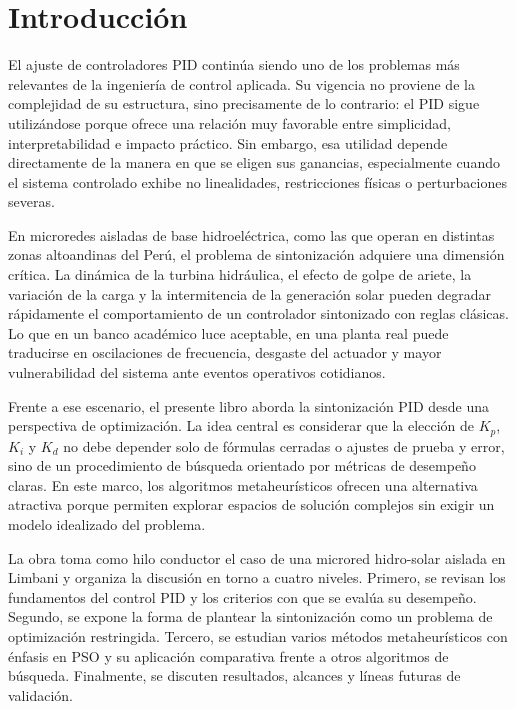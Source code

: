 \chapter*{Introducción}

El ajuste de controladores PID continúa siendo uno de los problemas más relevantes de la
ingeniería de control aplicada. Su vigencia no proviene de la complejidad de su estructura,
sino precisamente de lo contrario: el PID sigue utilizándose porque ofrece una relación
muy favorable entre simplicidad, interpretabilidad e impacto práctico. Sin embargo, esa
utilidad depende directamente de la manera en que se eligen sus ganancias, especialmente
cuando el sistema controlado exhibe no linealidades, restricciones físicas o perturbaciones
severas.

En microredes aisladas de base hidroeléctrica, como las que operan en distintas zonas
altoandinas del Perú, el problema de sintonización adquiere una dimensión crítica. La
dinámica de la turbina hidráulica, el efecto de golpe de ariete, la variación de la carga y la
intermitencia de la generación solar pueden degradar rápidamente el comportamiento de un
controlador sintonizado con reglas clásicas. Lo que en un banco académico luce aceptable,
en una planta real puede traducirse en oscilaciones de frecuencia, desgaste del actuador y
mayor vulnerabilidad del sistema ante eventos operativos cotidianos.

Frente a ese escenario, el presente libro aborda la sintonización PID desde una perspectiva
de optimización. La idea central es considerar que la elección de $K_p$, $K_i$ y $K_d$ no debe
depender solo de fórmulas cerradas o ajustes de prueba y error, sino de un procedimiento de
búsqueda orientado por métricas de desempeño claras. En este marco, los algoritmos
metaheurísticos ofrecen una alternativa atractiva porque permiten explorar espacios de
solución complejos sin exigir un modelo idealizado del problema.

La obra toma como hilo conductor el caso de una microred hidro-solar aislada en Limbani y
organiza la discusión en torno a cuatro niveles. Primero, se revisan los fundamentos del
control PID y los criterios con que se evalúa su desempeño. Segundo, se expone la forma de
plantear la sintonización como un problema de optimización restringida. Tercero, se estudian
varios métodos metaheurísticos con énfasis en PSO y su aplicación comparativa frente a
otros algoritmos de búsqueda. Finalmente, se discuten resultados, alcances y líneas futuras
de validación.

